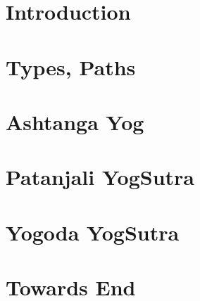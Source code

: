 \section[Intro]{Introduction}


\section[Types]{Types, Paths}


\section[Ashtanga]{Ashtanga Yog}











\section[Patanjali]{Patanjali YogSutra}






\section[Yogoda]{Yogoda YogSutra}



\section[End]{Towards End}
